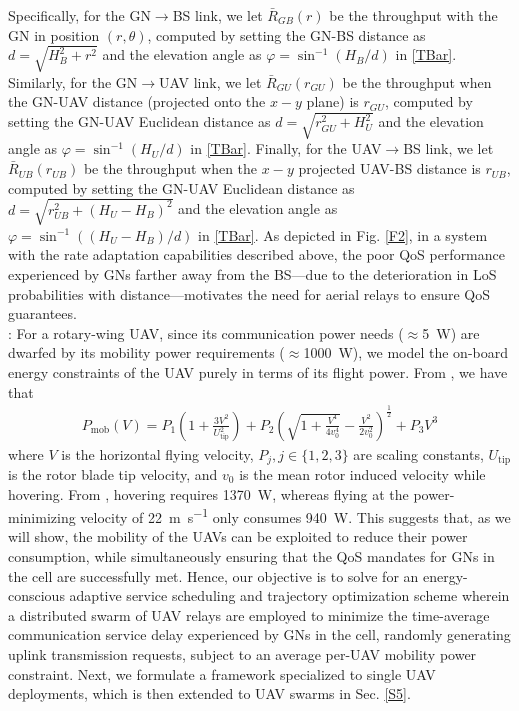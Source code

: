 \documentclass[10pt, twocolumn]{IEEEtran}
\theoremstyle{plain}
\theoremstyle{definition}
\theoremstyle{remark}
\begin{document}
Specifically, for the GN$\rightarrow$BS link, we let $\bar{R}_{GB}(r)$ be the throughput with the GN in position $(r,\theta)$, computed by setting the GN-BS distance as $d{=}\sqrt{H_{B}^{2}{+}r^{2}}$ and the elevation angle as $\varphi{=}\sin^{-1}\left(H_{B}/d\right)$ in \eqref{TBar}. Similarly, for the GN$\rightarrow$UAV link, we let $\bar{R}_{GU}(r_{GU})$ be the throughput when the GN-UAV distance (projected onto the $x{-}y$ plane) is $r_{GU}$, computed by setting the GN-UAV Euclidean distance as $d{=}\sqrt{r_{GU}^{2}{+}H_{U}^{2}}$ and the elevation angle as $\varphi{=}\sin^{-1}\left(H_{U}/d\right)$ in \eqref{TBar}. Finally, for the UAV$\rightarrow$BS link, we let $\bar{R}_{UB}(r_{UB})$ be the throughput when the $x{-}y$ projected UAV-BS distance is $r_{UB}$, computed by setting the GN-UAV Euclidean distance as $d{=}\sqrt{r_{UB}^{2}{+}(H_{U}{-}H_{B})^{2}}$ and the elevation angle as $\varphi{=}\sin^{-1}\left((H_{U}{-}H_{B})/d\right)$ in \eqref{TBar}. As depicted in Fig. \ref{F2}, in a system with the rate adaptation capabilities described above, the poor QoS performance experienced by GNs farther away from the BS---due to the deterioration in LoS probabilities with distance---motivates the need for aerial relays to ensure QoS guarantees.\\
: For a rotary-wing UAV, since its communication power needs ($\approx$\qty[mode=text]{5}{\watt}) are dwarfed by its mobility power requirements ($\approx$\qty[mode=text]{1000}{\watt}), we model the on-board energy constraints of the UAV purely in terms of its flight power. From \cite{SCA}, we have that
\begin{align*}
    P_{\mathrm{mob}}(V){=}P_{1}\left(1{+}\frac{3V^{2}}{U_{\mathrm{tip}}^{2}}\right){+}P_{2}\left(\sqrt{1{+}\frac{V^{4}}{4v_{0}^{4}}}{-}\frac{V^{2}}{2v_{0}^{2}}\right)^{\frac{1}{2}}{+}P_{3}V^{3}
\end{align*}
where $V$ is the horizontal flying velocity, $P_{j},j{\in}\{1,2,3\}$ are scaling constants, $U_{\mathrm{tip}}$ is the rotor blade tip velocity, and $v_{0}$ is the mean rotor induced velocity while hovering. From \cite{SCA}, hovering requires \qty[mode=text]{1370}{\watt}, whereas flying at the power-minimizing velocity of \qty[mode=text]{22}{\meter\per\second} only consumes \qty[mode=text]{940}{\watt}. This suggests that, as we will show, the mobility of the UAVs can be exploited to reduce their power consumption, while simultaneously ensuring that the QoS mandates for GNs in the cell are successfully met. Hence, our objective is to solve for an energy-conscious adaptive service scheduling and trajectory optimization scheme wherein a distributed swarm of UAV relays are employed to minimize the time-average communication service delay experienced by GNs in the cell, randomly generating uplink transmission requests, subject to an average per-UAV mobility power constraint. Next, we formulate a framework specialized to single UAV deployments, which is then extended to UAV swarms in Sec. \ref{S5}.
\vspace{-4mm}
\end{document}
